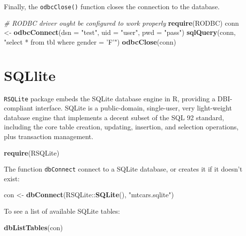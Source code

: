 \documentclass[]{book}
\newenvironment{Shaded}{\begin{snugshade}}{\end{snugshade}}
\newcommand{\KeywordTok}[1]{\textcolor[rgb]{0.13,0.29,0.53}{\textbf{{#1}}}}
\newcommand{\DataTypeTok}[1]{\textcolor[rgb]{0.13,0.29,0.53}{{#1}}}
\newcommand{\StringTok}[1]{\textcolor[rgb]{0.31,0.60,0.02}{{#1}}}
\newcommand{\CommentTok}[1]{\textcolor[rgb]{0.56,0.35,0.01}{\textit{{#1}}}}
\newcommand{\NormalTok}[1]{{#1}}
\begin{document}
Finally, the \texttt{odbcClose()} function closes the connection to the
database.

\begin{Shaded}
\begin{Highlighting}[]
\CommentTok{# RODBC driver ought be configured to work properly}
\KeywordTok{require}\NormalTok{(RODBC)}
\NormalTok{conn <-}\StringTok{ }\KeywordTok{odbcConnect}\NormalTok{(}\DataTypeTok{dsn =} \StringTok{"test"}\NormalTok{, }\DataTypeTok{uid =} \StringTok{"user"}\NormalTok{, }\DataTypeTok{pwd =} \StringTok{"pass"}\NormalTok{)}
\KeywordTok{sqlQuery}\NormalTok{(conn, }\StringTok{"select * from tbl where gender = 'F'"}\NormalTok{) }
\KeywordTok{odbcClose}\NormalTok{(conn)}
\end{Highlighting}
\end{Shaded}

\section{SQLlite}\label{sqllite}

\texttt{RSQLite} package embeds the SQLite database engine in R,
providing a DBI-compliant interface. SQLite is a public-domain,
single-user, very light-weight database engine that implements a decent
subset of the SQL 92 standard, including the core table creation,
updating, insertion, and selection operations, plus transaction
management.

\begin{Shaded}
\begin{Highlighting}[]
\KeywordTok{require}\NormalTok{(RSQLite)}
\end{Highlighting}
\end{Shaded}

The function \texttt{dbConnect} connect to a SQLite database, or creates
it if it doesn't exist:

\begin{Shaded}
\begin{Highlighting}[]
\NormalTok{con <-}\StringTok{ }\KeywordTok{dbConnect}\NormalTok{(RSQLite::}\KeywordTok{SQLite}\NormalTok{(), }\StringTok{"mtcars.sqlite"}\NormalTok{)}
\end{Highlighting}
\end{Shaded}

To see a list of available SQLite tables:

\begin{Shaded}
\begin{Highlighting}[]
\KeywordTok{dbListTables}\NormalTok{(con)}
\end{Highlighting}
\end{Shaded}
\end{document}
